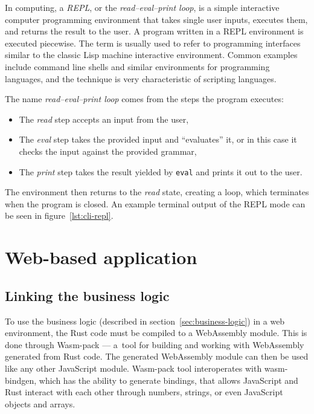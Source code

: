\documentclass[english,engineering]{wizthesis}
\begin{document}
In computing, a \emph{REPL}, or the \emph{read–eval–print loop}, is a simple
interactive computer programming environment that takes single user inputs,
executes them, and returns the result to the user. A program written in a REPL
environment is executed piecewise. The term is usually used to refer to
programming interfaces similar to the classic Lisp machine interactive
environment. Common examples include command line shells and similar
environments for programming languages, and the technique is very characteristic
of scripting languages.

The name \emph{read–eval–print loop} comes from the steps the program executes:
\begin{itemize}
  \item The \emph{read} step accepts an input from the user,
  \item The \emph{eval} step takes the provided input and ``evaluates'' it,
  or in this case it checks the input against the provided grammar,
  \item The \emph{print} step takes the result yielded by \texttt{eval} and
  prints it out to the user.
\end{itemize}
The environment then returns to the \emph{read} state, creating a loop, which
terminates when the program is closed. An example terminal output of the REPL
mode can be seen in figure~\ref{lst:cli-repl}.

\section{Web-based application} \label{sec:web-based-application}

\subsection{Linking the business logic}

To use the business logic (described in section~\ref{sec:business-logic}) in a
web environment, the Rust code must be compiled to a WebAssembly module. This is
done through Wasm-pack --- a~tool for building and working with WebAssembly
generated from Rust code. The generated WebAssembly module can then be used like
any other JavaScript module. Wasm-pack tool interoperates with wasm-bindgen,
which has the ability to generate bindings, that allows JavaScript and Rust
interact with each other through numbers, strings, or even JavaScript objects
and arrays.
\end{document}
